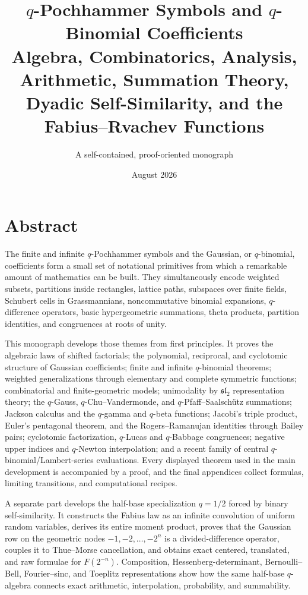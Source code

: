 \documentclass[11pt,oneside,openany]{book}
\title{\Huge\bfseries $q$-Pochhammer Symbols and $q$-Binomial Coefficients\\[8pt]
\Large Algebra, Combinatorics, Analysis, Arithmetic, Summation Theory,\\[3pt]
Dyadic Self-Similarity, and the Fabius--Rvachev Functions}
\author{A self-contained, proof-oriented monograph}
\date{August 2026}
\theoremstyle{definition}
\theoremstyle{remark}
\begin{document}
\frontmatter
\hypersetup{pageanchor=false}
\maketitle
\hypersetup{pageanchor=true}

\chapter*{Abstract}
The finite and infinite $q$-Pochhammer symbols and the Gaussian, or $q$-binomial, coefficients form a small set of notational primitives from which a remarkable amount of mathematics can be built.  They simultaneously encode weighted subsets, partitions inside rectangles, lattice paths, subspaces over finite fields, Schubert cells in Grassmannians, noncommutative binomial expansions, $q$-difference operators, basic hypergeometric summations, theta products, partition identities, and congruences at roots of unity.

This monograph develops those themes from first principles.  It proves the algebraic laws of shifted factorials; the polynomial, reciprocal, and cyclotomic structure of Gaussian coefficients; finite and infinite $q$-binomial theorems; weighted generalizations through elementary and complete symmetric functions; combinatorial and finite-geometric models; unimodality by $\mathfrak{sl}_2$ representation theory; the $q$-Gauss, $q$-Chu--Vandermonde, and $q$-Pfaff--Saalsch\"utz summations; Jackson calculus and the $q$-gamma and $q$-beta functions; Jacobi's triple product, Euler's pentagonal theorem, and the Rogers--Ramanujan identities through Bailey pairs; cyclotomic factorization, $q$-Lucas and $q$-Babbage congruences; negative upper indices and $q$-Newton interpolation; and a recent family of central $q$-binomial/Lambert-series evaluations.  Every displayed theorem used in the main development is accompanied by a proof, and the final appendices collect formulas, limiting transitions, and computational recipes.

A separate part develops the half-base specialization $q=1/2$ forced by binary self-similarity.  It constructs the Fabius law as an infinite convolution of uniform random variables, derives its entire moment product, proves that the Gaussian row on the geometric nodes $-1,-2,\ldots,-2^n$ is a divided-difference operator, couples it to Thue--Morse cancellation, and obtains exact centered, translated, and raw formulae for $F(2^{-n})$.  Composition, Hessenberg-determinant, Bernoulli--Bell, Fourier--sinc, and Toeplitz representations show how the same half-base $q$-algebra connects exact arithmetic, interpolation, probability, and summability.
\end{document}
